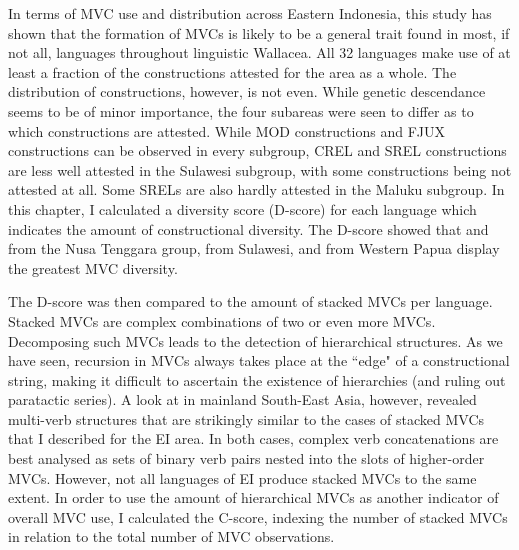 In terms of MVC use and distribution across Eastern Indonesia, this study has shown that the formation of MVCs is likely to be a general trait found in most, if not all, languages throughout linguistic Wallacea. All 32 languages make use of at least a fraction of the constructions attested for the area as a whole. The distribution of constructions, however, is not even. While genetic descendance seems to be of minor importance, the four subareas were seen to differ as to which constructions are attested. While MOD constructions and FJUX constructions can be observed in every subgroup, CREL and SREL constructions are less well attested in the Sulawesi subgroup, with some constructions being not attested at all. Some SRELs are also hardly attested in the Maluku subgroup. In this chapter, I calculated a diversity score (D-score) for each language which indicates the amount of constructional diversity. The D-score showed that  and  from the Nusa Tenggara group,  from Sulawesi, and  from Western Papua display the greatest MVC diversity.

The D-score was then compared to the amount of stacked MVCs per language. Stacked MVCs are complex combinations of two or even more MVCs. Decomposing such MVCs leads to the detection of hierarchical structures. As we have seen, recursion in MVCs always takes place at the ``edge" of a constructional string, making it difficult to ascertain the existence of hierarchies (and ruling out paratactic series). A look at  in mainland South-East Asia, however, revealed multi-verb structures that are strikingly similar to the cases of stacked MVCs that I described for the EI area. In both cases, complex verb concatenations are best analysed as sets of binary verb pairs nested into the slots of higher-order MVCs. However, not all languages of EI produce stacked MVCs to the same extent. In order to use the amount of hierarchical MVCs as another indicator of overall MVC use, I calculated the C-score, indexing the number of stacked MVCs in relation to the total number of MVC observations.


